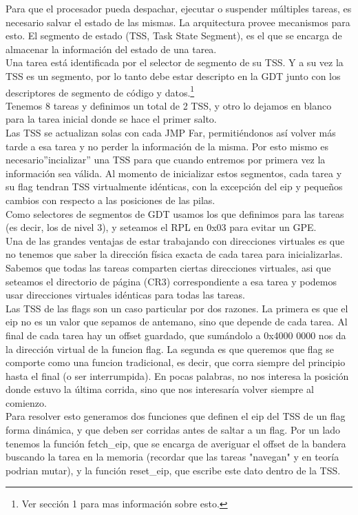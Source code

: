 Para que el procesador pueda despachar, ejecutar o suspender m\'ultiples tareas, es necesario salvar el estado de las mismas. La 
arquitectura provee mecanismos para esto. El segmento de estado (TSS, Task State Segment), es el que se encarga de almacenar la 
informaci\'on del estado de una tarea.\\

Una tarea est\'a identificada por el selector de segmento de su TSS. Y a su vez la TSS es un segmento, por lo tanto debe estar descripto 
en la GDT junto con los descriptores de segmento de c\'odigo y datos.\footnote{Ver secci\'on 1 para mas informaci\'on sobre esto.}\\

Tenemos 8 tareas y definimos un total de 2 TSS, y otro lo 
dejamos en blanco para la tarea inicial donde se hace el primer salto.\\

Las TSS se actualizan solas con cada JMP Far, permiti\'endonos as\'i volver m\'as tarde a esa tarea y no perder la informaci\'on de la 
misma. Por esto mismo es necesario''incializar'' una TSS para que cuando entremos por primera vez la informaci\'on
sea v\'alida. Al momento de inicializar estos segmentos, cada tarea y su flag tendran TSS virtualmente id\'enticas, con la excepci\'on del
 eip y pequeños cambios con respecto a las posiciones de las pilas.\\

Como selectores de segmentos de GDT usamos los que definimos para las tareas (es decir, los de nivel 3), y seteamos el RPL en 0x03 para 
evitar un GPE.\\

Una de las grandes ventajas de estar trabajando con direcciones virtuales es que no tenemos que saber la direcci\'on f\'isica exacta de
cada tarea para inicializarlas. Sabemos que todas las tareas comparten ciertas direcciones virtuales, asi que seteamos el directorio de 
p\'agina (CR3) correspondiente a esa tarea y podemos usar direcciones virtuales id\'enticas para todas las tareas. 
\\
Las TSS de las flags son un caso particular por dos razones. La primera es que el eip no es un valor que sepamos de antemano, sino que 
depende de cada tarea. Al final de cada tarea hay un offset guardado, que sum\'andolo a 0x4000 0000 nos da la direcci\'on virtual 
de la funcion flag. La segunda es que queremos que flag se comporte como una funcion tradicional, es decir, que corra siempre del 
principio hasta el final (o ser interrumpida). En pocas palabras, no nos interesa la posici\'on donde estuvo la \'ultima corrida, sino
que nos interesar\'ia volver siempre al comienzo.\\
Para resolver esto generamos dos funciones que definen el eip del TSS de un flag forma din\'amica, y que deben ser corridas antes de 
saltar a un flag. Por un lado tenemos la funci\'on fetch\_eip, que se encarga de averiguar el offset de la bandera buscando la tarea 
en la memoria (recordar que las tareas "navegan" y en teor\'ia podrian mutar), y la funci\'on reset\_eip, que escribe este dato dentro 
de la TSS.\\
